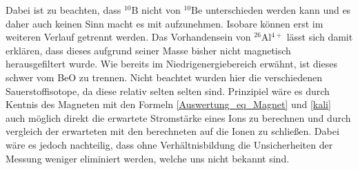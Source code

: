 Dabei ist zu beachten, dass $^{10}\text{B}$ nicht von $^{10}\text{Be}$ unterschieden werden kann und es daher auch keinen Sinn macht es mit aufzunehmen.
Isobare können erst im weiteren Verlauf getrennt werden.
Das Vorhandensein von $^{26}$Al$^{4+}$ lässt sich damit erklären, dass dieses aufgrund seiner Masse bisher nicht magnetisch herausgefiltert wurde.
Wie bereits im Niedrigenergiebereich erwähnt, ist dieses schwer vom BeO zu trennen.
Nicht beachtet wurden hier die verschiedenen Sauerstoffisotope, da diese relativ selten selten sind.
Prinzipiel wäre es durch Kentnis des Magneten mit den Formeln \ref{Auswertung_eq_Magnet} und \ref{kali} auch möglich direkt die erwartete Stromstärke eines Ions zu berechnen und durch vergleich der erwarteten mit den berechneten auf die Ionen zu schließen.
Dabei wäre es jedoch nachteilig, dass ohne Verhältnisbildung die Unsicherheiten der Messung weniger eliminiert werden, welche uns nicht bekannt sind.

\clearpage

